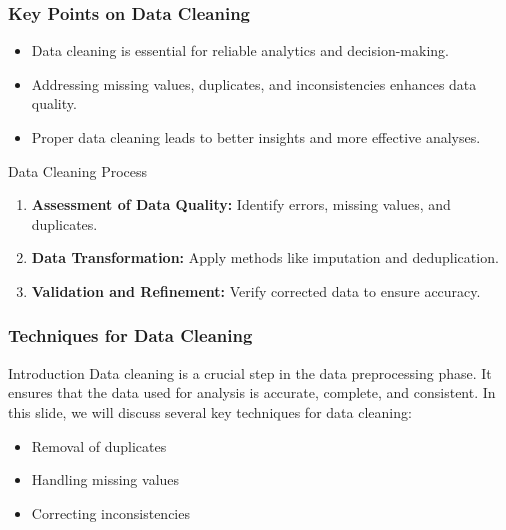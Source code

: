 \documentclass[aspectratio=169]{beamer}
\begin{document}
\begin{frame}[fragile]
    \frametitle{Key Points on Data Cleaning}
    \begin{itemize}
        \item Data cleaning is essential for reliable analytics and decision-making.
        \item Addressing missing values, duplicates, and inconsistencies enhances data quality.
        \item Proper data cleaning leads to better insights and more effective analyses.
    \end{itemize}

    \begin{block}{Data Cleaning Process}
        \begin{enumerate}
            \item \textbf{Assessment of Data Quality:} Identify errors, missing values, and duplicates.
            \item \textbf{Data Transformation:} Apply methods like imputation and deduplication.
            \item \textbf{Validation and Refinement:} Verify corrected data to ensure accuracy.
        \end{enumerate}
    \end{block}
\end{frame}

\begin{frame}
    \frametitle{Techniques for Data Cleaning}
    \begin{block}{Introduction}
        Data cleaning is a crucial step in the data preprocessing phase. It ensures that the data used for analysis is accurate, complete, and consistent. In this slide, we will discuss several key techniques for data cleaning:
        \begin{itemize}
            \item Removal of duplicates
            \item Handling missing values
            \item Correcting inconsistencies
        \end{itemize}
    \end{block}
\end{frame}
\end{document}
